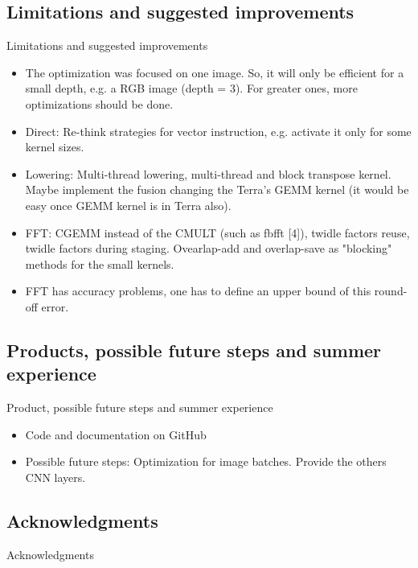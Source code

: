 \documentclass{beamer}
\begin{document}
\subsection{Limitations and suggested improvements}
\begin{frame}{Limitations and suggested improvements}
  \begin{itemize}
  \item {
   The optimization was focused on one image. So, it will only be efficient for a small depth, e.g. a RGB image (depth = 3). For greater ones, more optimizations should be done.
  }
  \item {
   Direct: Re-think strategies for vector instruction, e.g. activate it only for some kernel sizes. 
  }
  \item {
   Lowering: Multi-thread lowering, multi-thread and block transpose kernel. Maybe implement the fusion changing the Terra's GEMM kernel (it would be easy once GEMM kernel is in Terra also).
  }
  \item {
   FFT: CGEMM instead of the CMULT (such as fbfft [4]), twidle factors reuse, twidle factors during staging. Ovearlap-add and overlap-save as "blocking" methods for the small kernels. 
  }
  \item {
  FFT has accuracy problems, one has to define an upper bound of this round-off error.
  }
  \end{itemize}
\end{frame}
\subsection{Products, possible future steps and summer experience}
\begin{frame}{Product, possible future steps and summer experience}
  \begin{itemize}
  \item {
   Code and documentation on GitHub
  }
  \item {
   Possible future steps: Optimization for image batches.    Provide the others CNN layers.
  }
  \end{itemize}
\end{frame}

\subsection{Acknowledgments}

\begin{frame}{Acknowledgments}

\end{frame}
\end{document}

